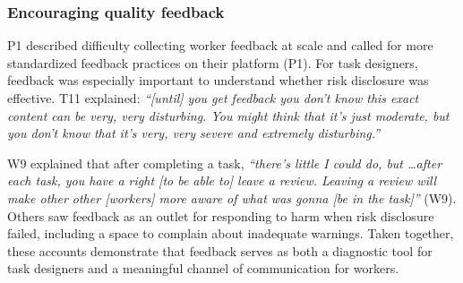 \subsubsection{Encouraging quality feedback}
P1 described difficulty collecting worker feedback at scale and called for more standardized feedback practices on their platform (P1). For task designers, feedback was especially important to understand whether risk disclosure was effective. T11 explained: 
\textit{``[until] you get feedback you don't know this exact content can be very, very disturbing. You might think that it's just moderate, but you don't know that it's very, very severe and extremely disturbing.''}

  W9 explained that after completing a task, \textit{``there's little I could do, but \dots after each task, you have a right [to be able to] leave a review. Leaving a review will make other other [workers] more aware of what was gonna [be in the task]''} (W9). Others saw feedback as an outlet for responding to harm when risk disclosure failed, including a space to complain about inadequate warnings. Taken together, these accounts demonstrate that feedback serves as both a diagnostic tool for task designers and a meaningful channel of communication for workers.

